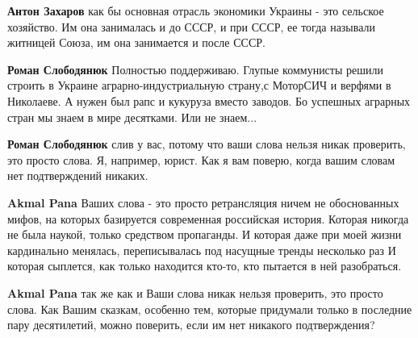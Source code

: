 \begin{itemize}
\begin{itemize}
\textbf{Антон Захаров} как бы основная отрасль экономики Украины - это сельское хозяйство. Им она занималась и до СССР, и при СССР, ее тогда называли житницей Союза, им она занимается и после СССР.

 
\textbf{Роман Слободянюк} Полностью поддерживаю. Глупые коммунисты решили строить в Украине аграрно-индустриальную страну,с МоторСИЧ и верфями в Николаеве. А нужен был рапс и кукуруза вместо заводов. Бо успешных аграрных стран мы знаем в мире десятками. Или не знаем...

 
\textbf{Роман Слободянюк} слив у вас, потому что ваши слова нельзя никак проверить, это просто слова. Я, например, юрист. Как я вам поверю, когда вашим словам нет подтверждений никаких.

 
\textbf{Akmal Pana} Ваших слова - это просто ретрансляция ничем не обоснованных мифов, на которых базируется современная российская история. Которая никогда не была наукой, только средством пропаганды. И которая даже при моей жизни кардинально менялась, переписывалась под насущные тренды несколько раз И которая сыплется, как только находится кто-то, кто пытается в ней разобраться.

 
\textbf{Akmal Pana} так же как и Ваши слова никак нельзя проверить, это просто слова. Как Вашим сказкам, особенно тем, которые придумали только в последние пару десятилетий, можно поверить, если им нет никакого подтверждения?

 

\end{itemize}
\end{itemize}
